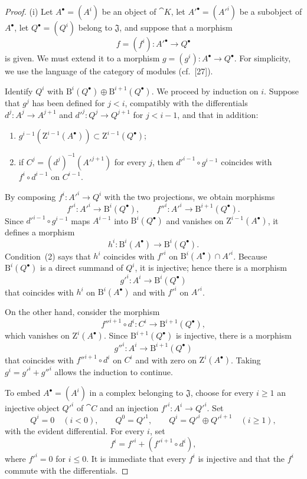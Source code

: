 \begin{proof}
{\rm(i)}
Let $A^\bullet=(A^i)$ be an object of $\cat{K}$, let $A'^\bullet=(A'^i)$ be a subobject of $A^\bullet$, let $Q^\bullet=(Q^i)$ belong to $\mathfrak{J}$, and suppose that a morphism
\[
  f=(f^i):A'^\bullet\longrightarrow Q^\bullet
\]
is given.
We must extend it to a morphism $g=(g^i):A^\bullet\to Q^\bullet$.
For simplicity, we use the language of the category of modules (cf.~[27]).

Identify $Q^i$ with $\mathrm{B}^i(Q^\bullet)\oplus\mathrm{B}^{i+1}(Q^\bullet)$.
We proceed by induction on $i$.
Suppose that $g^j$ has been defined for $j<i$, compatibly with the differentials $d^j:A^j\to A^{j+1}$ and $d'^j:Q^j\to Q^{j+1}$ for $j<i-1$, and that in addition:
\begin{enumerate}
  \item[{\rm(1)}] $g^{i-1}(\mathrm{Z}^{i-1}(A^\bullet))\subset\mathrm{Z}^{i-1}(Q^\bullet)$;
  \item[{\rm(2)}] if $C^j=(d^j)^{-1}(A'^{j+1})$ for every $j$, then $d'^{i-1}\circ g^{i-1}$ coincides with $f^i\circ d^{i-1}$ on $C^{i-1}$.
\end{enumerate}
By composing $f^i:A'^i\to Q^i$ with the two projections, we obtain morphisms
\[
  f'^i:A'^i\longrightarrow\mathrm{B}^i(Q^\bullet),
  \qquad
  f''^i:A'^i\longrightarrow\mathrm{B}^{i+1}(Q^\bullet).
\]
Since $d'^{i-1}\circ g^{i-1}$ maps $A^{i-1}$ into $\mathrm{B}^i(Q^\bullet)$ and vanishes on $\mathrm{Z}^{i-1}(A^\bullet)$, it defines a morphism
\[
  h^i:\mathrm{B}^i(A^\bullet)\longrightarrow\mathrm{B}^i(Q^\bullet).
\]
Condition~{\rm(2)} says that $h^i$ coincides with $f'^i$ on $\mathrm{B}^i(A^\bullet)\cap A'^i$.
Because $\mathrm{B}^i(Q^\bullet)$ is a direct summand of $Q^i$, it is injective; hence there is a morphism
\[
  g'^i:A^i\longrightarrow\mathrm{B}^i(Q^\bullet)
\]
that coincides with $h^i$ on $\mathrm{B}^i(A^\bullet)$ and with $f'^i$ on $A'^i$.

On the other hand, consider the morphism
\[
  f''^{i+1}\circ d^i:C^i\longrightarrow\mathrm{B}^{i+1}(Q^\bullet),
\]
which vanishes on $\mathrm{Z}^i(A^\bullet)$.
Since $\mathrm{B}^{i+1}(Q^\bullet)$ is injective, there is a morphism
\[
  g''^i:A^i\longrightarrow\mathrm{B}^{i+1}(Q^\bullet)
\]
that coincides with $f''^{i+1}\circ d^i$ on $C^i$ and with zero on $\mathrm{Z}^i(A^\bullet)$.
Taking $g^i=g'^i+g''^i$ allows the induction to continue.

\smallskip
{}
To embed $A^\bullet=(A^i)$ in a complex belonging to $\mathfrak{J}$, choose for every $i\geq1$ an injective object $Q'^i$ of $\cat{C}$ and an injection $f'^i:A^i\to Q'^i$.
Set
\[
  Q^i=0\quad(i<0),\qquad Q^0=Q'^1,\qquad
  Q^i=Q'^i\oplus Q'^{i+1}\quad(i\geq1),
\]
with the evident differential.
For every $i$, set
\[
  f^i=f'^i+(f'^{i+1}\circ d^i),
\]
where $f'^i=0$ for $i\leq0$.
It is immediate that every $f^i$ is injective and that the $f^i$ commute with the differentials.
\end{proof}

